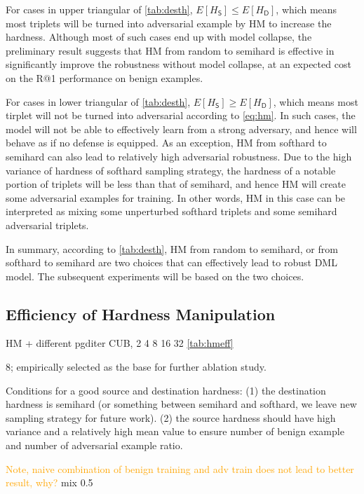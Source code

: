 \documentclass[10pt,twocolumn,letterpaper]{article}
\newcommand{\oo}[1]{\textcolor{orange}{#1}}
\begin{document}
For cases in upper triangular of \cref{tab:desth}, $E[H_\mathsf{S}] \leqslant E[H_\mathsf{D}]$,
which means most triplets will be turned into adversarial example by HM
to increase the hardness.
%
Although most of such cases end up with model collapse, the preliminary 
result suggests that HM from random to semihard is effective in significantly
improve the robustness without model collapse, at an expected cost on the R@1
performance on benign examples.

For cases in lower triangular of \cref{tab:desth}, $E[H_\mathsf{S}] \geqslant E[H_\mathsf{D}]$,
which means most tirplet will not be turned into adversarial according to
\cref{eq:hm}.
%
In such cases, the model will not be able to effectively learn from a strong
adversary, and hence will behave as if no defense is equipped.
%
As an exception, HM from softhard to semihard can also lead to relatively high
adversarial robustness.
%
Due to the high variance of hardness of softhard sampling strategy, the
hardness of a notable portion of triplets will be less than that of semihard,
and hence HM will create some adversarial examples for training.
%
In other words, HM in this case can be interpreted as mixing some unperturbed
softhard triplets and some semihard adversarial triplets.


In summary, according to \cref{tab:desth}, HM from random to semihard, or from
softhard to semihard are two choices that can effectively lead to robust
DML model.
%
The subsequent experiments will be based on the two choices.

\subsection{Efficiency of Hardness Manipulation}
\label{sec:42}

HM + different pgditer
CUB, 2 4 8 16 32
\cref{tab:hmeff}

8; empirically selected as the base for further ablation study.

Conditions for a good source and destination hardness:
%
(1) the destination hardness is semihard (or something between semihard
and softhard, we leave new sampling strategy for future work).
(2) the source hardness should have high variance and a relatively high mean
value to ensure number of benign example and number of adversarial example ratio.

\oo{Note, naive combination of benign training and adv train does not lead to better
result, why?} mix 0.5
\end{document}
